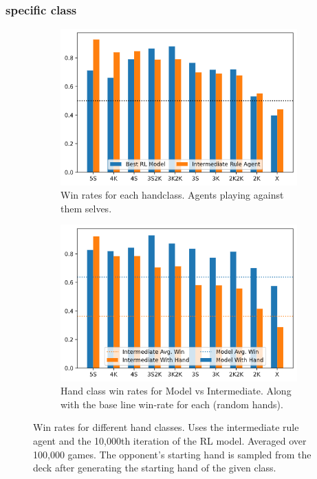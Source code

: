 \documentclass[../main.tex]{subfiles}
\begin{document}
\subsubsection{specific class}

\begin{figure}
    \centering
    \begin{subfigure}[t]{0.49\textwidth}
        \centering
        \includegraphics[width=\textwidth,keepaspectratio]{images/results/handclasses.png}
        \caption{Win rates for each handclass. Agents playing against them selves.}
        \label{fig:handclass-vs-self}
    \end{subfigure}
    \hfill
    \begin{subfigure}[t]{0.49\textwidth}
        \centering
        \includegraphics[width=\textwidth,keepaspectratio]{images/results/handclasses_model_vs_rules.png}
        \caption{Hand class win rates for Model vs Intermediate. Along with the base line win-rate for each (random hands).}
        \label{fig:handclass-int-vs-model}
    \end{subfigure}
    \label{fig:handclass-winrates}
    \caption{Win rates for different hand classes. Uses the intermediate rule agent and the 10,000th iteration of the RL model. Averaged over 100,000 games. The opponent's starting hand is sampled from the deck after generating the starting hand of the given class.}
\end{figure}
\end{document}
